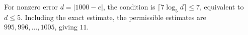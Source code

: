 For nonzero error $d=|1000-e|$, the condition is $\lceil7\log_5d\rceil\le7$, equivalent to $d\le5$. Including the exact estimate, the permissible estimates are $995,996,\ldots,1005$, giving $\boxed{11}$.
